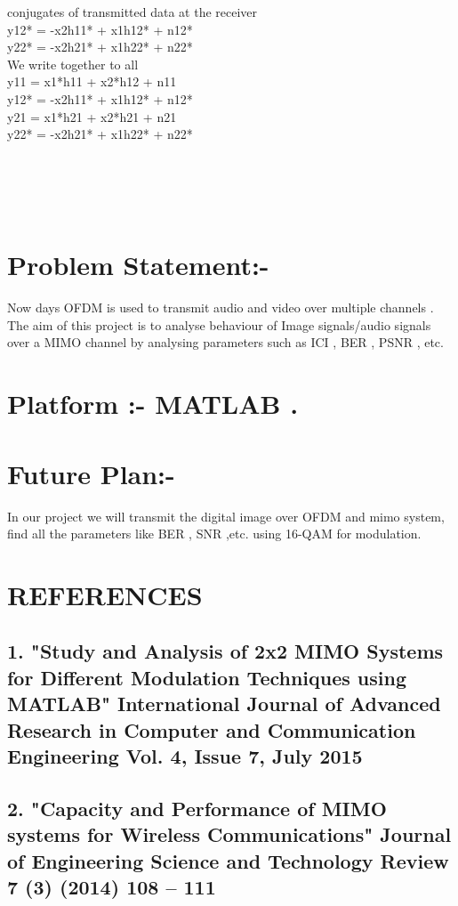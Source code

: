 \documentclass[12pt]{report}
\begin{document}
conjugates of transmitted data at the receiver\\
y12* = -x2h11* + x1h12* + n12*\\
y22* = -x2h21* + x1h22* + n22*\\
We write  together to all\\
y11 = x1*h11 + x2*h12 + n11\\
y12* = -x2h11* + x1h12* + n12*\\
y21 = x1*h21 + x2*h21 + n21\\ 
y22* = -x2h21* + x1h22* + n22*\\ \\ \\ \\ \\ 

\section*{Problem Statement:-}
Now days OFDM is used to transmit audio and video over multiple channels . The aim of this project is to analyse behaviour of Image signals/audio signals over a MIMO channel by analysing parameters such as ICI , BER , PSNR , etc.

\section*{Platform :- MATLAB .} 

\section*{Future Plan:-}
In our project  we will transmit the digital image over OFDM and mimo system, find all the parameters like BER , SNR ,etc. using 16-QAM for modulation.


\section*{REFERENCES}
\subsection*{1. "Study and Analysis of 2x2 MIMO Systems for
Different Modulation Techniques using
MATLAB" International Journal of Advanced Research in Computer and Communication Engineering
Vol. 4, Issue 7, July 2015}
\subsection*{2. "Capacity and Performance of MIMO systems for Wireless Communications" Journal of Engineering Science and Technology Review 7 (3) (2014) 108 – 111}
\end{document}
